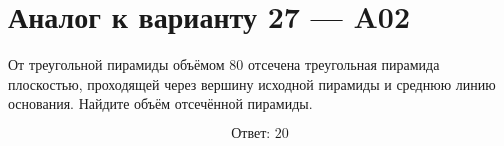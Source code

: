 \documentclass[12pt,a4paper]{article}
\begin{document}
\section*{Аналог к варианту 27 — A02}

От треугольной пирамиды объёмом \(80\) отсечена треугольная пирамида плоскостью, проходящей через вершину исходной пирамиды и среднюю линию основания. Найдите объём отсечённой пирамиды.

\begin{center}
\end{center}

\[
\boxed{\text{Ответ: }20}
\]
\end{document}
